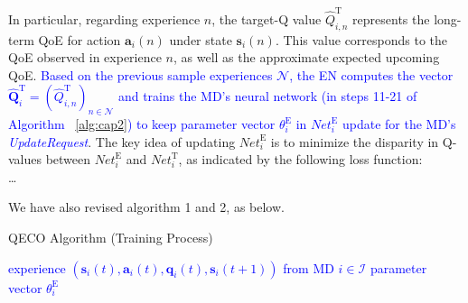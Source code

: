 \documentclass[12pt,draftclsnofoot,onecolumn]{IEEEtran}
\newcommand{\rev}[1]{{\color{blue}#1}} %
\newcommand{\rev}[1]{#1}
\newenvironment{my}[2]%
{\begin{list}{}%
{\setlength{\rightmargin}{#1}\setlength{\leftmargin}{#2}}%


 \item[]{}

} {\end{list}}
\begin{document}
\begin{enumerate}
	\begin{my}{1cm}{1cm}
		\rev{In particular, regarding experience $n$, the target-Q value $\hat{Q}_{i,n}^{\text{T}}$ represents the long-term QoE for action $\boldsymbol{a}_i(n)$ under state $\boldsymbol{s}_i(n)$. This value corresponds to the QoE observed in experience $n$, as well as the approximate expected upcoming QoE. 
			\textcolor{blue}{Based on the previous sample experiences $\mathcal{N}$, the EN computes the vector $\hat{\mathbf{Q}}_i^{\text{T}} = (\hat{Q}^{\text{T}}_{i,n})_{n \in \mathcal{N}}$ and trains the MD's neural network (in steps 11-21 of Algorithm ~\ref{alg:cap2}) to keep parameter vector $\theta^{\text{E}}_i$ in $\textit{Net}_i^{\text{E}}$ update for the MD's \textit{UpdateRequest}}. The key idea of updating $\textit{Net}_i^{\text{E}}$ is to minimize the disparity in Q-values between $\textit{Net}_i^{\text{E}}$ and $\textit{Net}_i^{\text{T}}$, as indicated by the following loss function:\\ \dots}
	\end{my}
		
	We have also revised algorithm 1 and 2, as below.\\	
	

\begin{my}{0.5cm}{0.5cm}	
\rev{\begin{minipage}[b]{0.87\textwidth} 
	\begin{algorithm}[H] \caption{QECO Algorithm (Training Process)}\label{alg:cap2} \centering 
		\begin{algorithmic}[1] \renewcommand{\algorithmicrequire}{\textbf{\textcolor{blue}{Input:}}} \renewcommand{\algorithmicensure}{\textbf{\textcolor{blue}{Output:}}} \Require \textcolor{blue}{experience $(\boldsymbol{s}_i(t), \boldsymbol{a}_i(t), \boldsymbol{q}_i(t), \boldsymbol{s}_i(t+1))$ from MD $i \in \mathcal{I}$} \Ensure \textcolor{blue}{parameter vector $\theta_i^{\text{E}}$} 
	\end{algorithmic} 
\end{algorithm} 
\end{minipage}
\vspace{5mm}

}
\end{my}
\end{enumerate}
\end{document}
